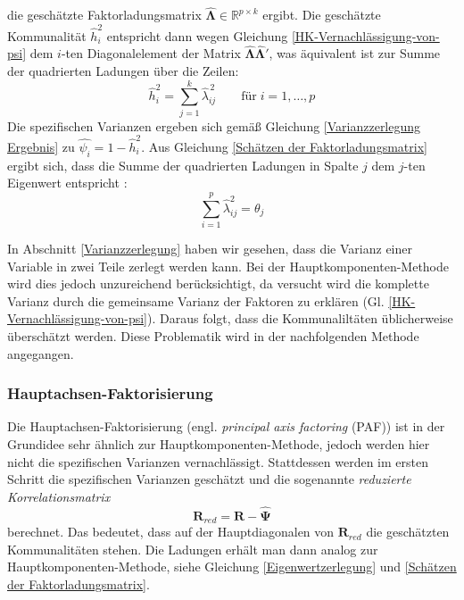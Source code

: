 \documentclass[11pt]{scrartcl}
\begin{document}
	die geschätzte Faktorladungsmatrix $\mathbf{\widehat{\Lambda}} \in \mathbb{R}^{p \times k}$ ergibt.
	Die geschätzte Kommunalität $\hat{h}_i^2$ entspricht dann wegen Gleichung \ref{HK-Vernachlässigung-von-psi}
	dem $i$-ten Diagonalelement der Matrix $\mathbf{\widehat{\Lambda}} \mathbf{\widehat{\Lambda}}'$,
	was äquivalent ist zur Summe der quadrierten Ladungen über die Zeilen:
	\begin{equation} \label{Schätzen der Kommunalitäten}
		\hat{h}_i^2 = \sum_{j=1}^{k} \hat{\lambda}_{ij}^{\,2} \qquad \text{für} \; i=1,\dotsc,p
	\end{equation}
	Die spezifischen Varianzen ergeben sich gemäß Gleichung \ref{Varianzzerlegung Ergebnis} zu
	$\hat{\psi_i} = 1 - \hat{h}_i^2$. Aus Gleichung \ref{Schätzen der Faktorladungsmatrix} ergibt sich,
	dass die Summe der 
	quadrierten Ladungen in Spalte $j$ dem $j$-ten Eigenwert entspricht \parencite[vgl.][418]{Rencher.2002}:
	\begin{equation}
		\sum_{i=1}^{p} \hat{\lambda}^2_{ij} = \theta_j
	\end{equation}
	
	In Abschnitt \ref{Varianzzerlegung} haben wir gesehen, dass die Varianz einer
	Variable in zwei Teile zerlegt werden kann. Bei der Hauptkomponenten-Methode
	wird dies jedoch unzureichend berücksichtigt, da versucht wird die komplette
	Varianz durch die gemeinsame Varianz der Faktoren zu erklären (Gl. \ref{HK-Vernachlässigung-von-psi}). Daraus folgt,
	dass die Kommunaliltäten üblicherweise überschätzt werden.
	Diese Problematik wird in der nachfolgenden Methode angegangen.
	
	\subsubsection{Hauptachsen-Faktorisierung} \label{HAF}
	Die Hauptachsen-Faktorisierung (engl. \textit{principal axis factoring} (PAF)) ist in
	der Grundidee sehr ähnlich zur Hauptkomponenten-Methode, jedoch werden hier nicht die spezifischen Varianzen vernachlässigt. Stattdessen werden im ersten
	Schritt die spezifischen Varianzen geschätzt und die sogenannte
	\textit{reduzierte Korrelationsmatrix} 
	\begin{equation}
		\label{reduzierte Korrelationsmatrix}
		\mathbf{R}_{red} = \mathbf{R} - \widehat{\mathbf{\Psi}}
	\end{equation}
	berechnet. Das bedeutet, dass auf der Hauptdiagonalen
	von $\mathbf{R}_{red}$ die geschätzten Kommunalitäten stehen. Die Ladungen
	erhält man dann analog zur Hauptkomponenten-Methode, siehe Gleichung
	\ref{Eigenwertzerlegung} und \ref{Schätzen der Faktorladungsmatrix}.
	
\end{document}
